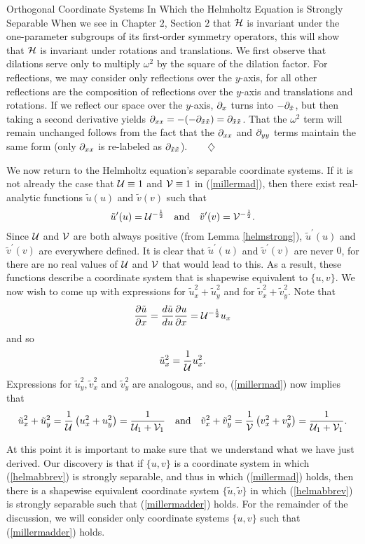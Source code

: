 \begin{section}{Orthogonal Coordinate Systems In Which the Helmholtz Equation is Strongly Separable}
When we see in Chapter $2$, Section $2$ that $\mathcal{H}$ is invariant under the one-parameter subgroups of its first-order symmetry operators, this will show that $\mathcal{H}$ is invariant under rotations and translations.  We first observe that dilations serve only to multiply $\omega^2$ by the square of the dilation factor.  For reflections, we may consider only reflections over the $y$-axis, for all other reflections are the composition of reflections over the $y$-axis and translations and rotations.  If we reflect our space over the $y$-axis, $\partial_{x}$ turns into $-\partial_{\tilde{x}}$, but then taking a second derivative yields $\partial_{x x} = - (-\partial_{\tilde{x} \tilde{x}}) = \partial_{\tilde{x} \tilde{x}}$.  That the $\omega^2$ term will remain unchanged follows from the fact that the $\partial_{x x}$ and $\partial_{y y}$ terms maintain the same form (only $\partial_{x x}$ is re-labeled as $\partial_{\tilde{x} \tilde{x}}$).$\qquad \diamondsuit$

\eex

We now return to the Helmholtz equation's separable coordinate systems.  If it is not already the case that $\mathcal{U} \equiv 1$ and $\mathcal{V} \equiv 1$ in (\ref{millermad}), then there exist real-analytic functions $\tilde{u}(u)$ and $\tilde{v}(v)$ such that
\[
\tilde{u}^\prime(u) = \mathcal{U}^{-\frac{1}{2}}
\quad \mbox{and} \quad
\tilde{v}^\prime(v) = \mathcal{V}^{-\frac{1}{2}}.
\]
Since $\mathcal{U}$ and $\mathcal{V}$ are both always positive (from Lemma \ref{helmstrong}), $\tilde{u}^\prime(u)$ and $\tilde{v}^\prime(v)$ are everywhere defined.  It is clear that $\tilde{u}^\prime(u)$ and $\tilde{v}^\prime(v)$ are never $0$, for there are no real values of $\mathcal{U}$ and $\mathcal{V}$ that would lead to this.  As a result, these functions describe a coordinate system that is shapewise equivalent to $\{ u,v \}$.  We now wish to come up with expressions for $\tilde{u}_x^2 + \tilde{u}_y^2$ and for $\tilde{v}_x^2 + \tilde{v}_y^2$.  Note that
\[
\frac{\partial \tilde{u}}{\partial x} = \frac{d \tilde{u}}{d u} \frac{\partial u}{\partial x} = \mathcal{U}^{-\frac{1}{2}}u_x
\]
and so
\[
\tilde{u}_x^2 = \frac{1}{\mathcal{U}}u_x^2.
\]
Expressions for $\tilde{u}_y^2, \tilde{v}_x^2$ and $\tilde{v}_y^2$ are analogous, and so, (\ref{millermad}) now implies that
\begin{equation}
\label{millermadder}
\tilde{u}_x^2 + \tilde{u}_y^2 = \frac{1}{\mathcal{U}} \left( u_x^2 + u_y^2 \right) = \frac{1}{\mathcal{U}_1 + \mathcal{V}_1}
\quad \mbox{and} \quad
\tilde{v}_x^2 + \tilde{v}_y^2 = \frac{1}{\mathcal{V}} \left( v_x^2 + v_y^2 \right) = \frac{1}{\mathcal{U}_1 + \mathcal{V}_1}.
\end{equation}

At this point it is important to make sure that we understand what we have just derived.  Our discovery is that if $\{ u,v \}$ is a coordinate system in which (\ref{helmabbrev}) is strongly separable, and thus in which (\ref{millermad}) holds, then there is a shapewise equivalent coordinate system $\{ \tilde{u}, \tilde{v} \}$ in which (\ref{helmabbrev}) is strongly separable such that (\ref{millermadder}) holds.  For the remainder of the discussion, we will consider only coordinate systems $\{ u,v \}$ such that (\ref{millermadder}) holds.


\end{section}
